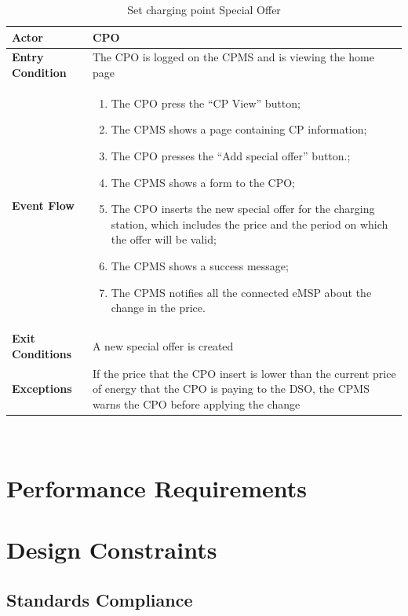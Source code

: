 \documentclass{Configuration_Files/PoliMi3i_thesis}
\begin{document}
\begin{table}[H]
    \begin{tabularx}{\textwidth}{| >{\columncolor{bluepoli!40}}l | X |}
    \hline
    \textbf{Actor} & CPO\T\B \\
    \hline
    \textbf{Entry Condition} & The CPO is logged on the CPMS and is viewing the home page\T\B\\
    \hline
    \textbf{Event Flow} & 
        \begin{enumerate}
        \item The CPO press the “CP View” button;
        \item The CPMS shows a page containing CP information;
        \item The CPO presses the “Add special offer” button.;
        \item The CPMS shows a form to the CPO;
        \item The CPO inserts the new special offer for the charging station, which includes the price and the period on which the offer will be valid;
        \item The CPMS shows a success message;
        \item The CPMS notifies all the connected eMSP about the change in the price.
        \end{enumerate}\B\\
    \hline
    \textbf{Exit Conditions} & A new special offer is created\B\\
    \hline
    \textbf{Exceptions} & If the price that the CPO insert is lower than the current price of energy that the CPO is paying to the DSO, the CPMS warns the CPO before applying the change\B\\
    \hline
    \end{tabularx}
    \\[10pt]
    \caption{Set charging point Special Offer}
    \label{table:example}
\end{table}

\section{Performance Requirements}

\section{Design Constraints}

\subsection{Standards Compliance}
\end{document}
